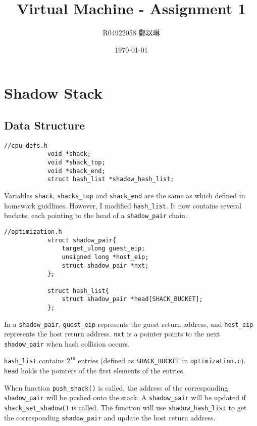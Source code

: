 \documentclass[12pt]{article}
\title{\textbf{Virtual Machine - Assignment 1}}
\author{R04922058 鄭以琳}
\date{\large \today}
\begin{document}
\maketitle

\section{Shadow Stack}
    \subsection{Data Structure}
        \begin{lstlisting}[style=Structure]
            //cpu-defs.h
            void *shack;
            void *shack_top;
            void *shack_end;
            struct hash_list *shadow_hash_list;
        \end{lstlisting}
        
        Variables \verb|shack|, \verb|shacks_top| and \verb|shack_end| are the same as which defined in homework guidlines.
        However, I modified \verb|hash_list|.
        It now contains several buckets, each pointing to the head of a \verb|shadow_pair| chain.
        \\
        \begin{lstlisting}[style=Structure]
            //optimization.h
            struct shadow_pair{
                target_ulong guest_eip;
                unsigned long *host_eip;
                struct shadow_pair *nxt;
            };

            struct hash_list{
                struct shadow_pair *head[SHACK_BUCKET];
            };
        \end{lstlisting}
        
        In a \verb|shadow_pair|, \verb|guest_eip| represents the guest return address, and \verb|host_eip| represents the host return address.
        \verb|nxt| is a pointer points to the next \verb|shadow_pair| when hash collision occurs.
        
        \verb|hash_list| contains $2^{16}$ entries (defined as \verb|SHACK_BUCKET| in \verb|optimization.c|).
        \verb|head| holds the pointers of the first elements of the entries.

        When function \verb|push_shack()| is called, the address of the corresponding \verb|shadow_pair| will be pushed onto the stack. 
        A \verb|shadow_pair| will be updated if \verb|shack_set_shadow()| is called. The function will use \verb|shadow_hash_list| to get the corresponding \verb|shadow_pair| and update the host return address.
\end{document}
